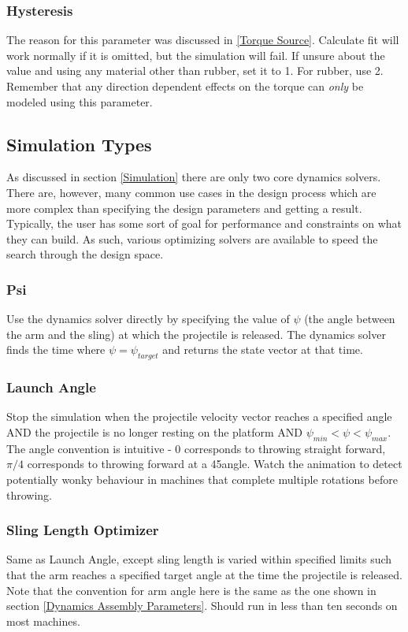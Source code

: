 \documentclass{article}
\begin{document}
\subsubsection{Hysteresis}
The reason for this parameter was discussed in \ref{Torque Source}. Calculate fit will work normally if it is omitted, but the simulation will fail. If unsure about the value and using any material other than rubber, set it to 1. For rubber, use 2. Remember that any direction dependent effects on the torque can \emph{only} be modeled using this parameter. 

\subsection{Simulation Types}
As discussed in section \ref{Simulation} there are only two core dynamics solvers. There are, however, many common use cases in the design process which are more complex than specifying the design parameters and getting a result. Typically, the user has some sort of goal for performance and constraints on what they can build. As such, various optimizing solvers are available to speed the search through the design space.
\subsubsection{Psi}
Use the dynamics solver directly by specifying the value of $\psi$ (the angle between the arm and the sling) at which the projectile is released. The dynamics solver finds the time where $\psi = \psi_{target}$ and returns the state vector at that time.
\subsubsection{Launch Angle}
Stop the simulation when the projectile velocity vector reaches a specified angle AND the projectile is no longer resting on the platform AND $\psi_{min} < \psi < \psi_{max}$. The angle convention is intuitive - 0 corresponds to throwing straight forward, $\pi/4$ corresponds to throwing forward at a 45\degree angle. Watch the animation to detect potentially wonky behaviour in machines that complete multiple rotations before throwing.
\subsubsection{Sling Length Optimizer}
Same as Launch Angle, except sling length is varied within specified limits such that the arm reaches a specified target angle at the time the projectile is released. Note that the convention for arm angle here is the same as the one shown in section \ref{Dynamics Assembly Parameters}. Should run in less than ten seconds on most machines.
\end{document}
